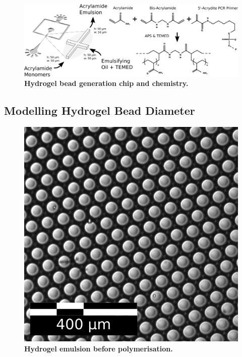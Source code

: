 \begin{figure}[ht]
\centerfloat
\includegraphics[width=\textwidth]{./ims/indrop_beadgen2.png}
\caption[Hydrogel bead generation chip and chemistry]{\textbf{Hydrogel bead generation chip and chemistry.}}
 \label{fig:indrop_beadgen}
\end{figure}

\subsection{Modelling Hydrogel Bead Diameter}
\label{subsect:indrop_model}

\begin{figure}
\vspace{-10pt}
\centering
\includegraphics[width=\textwidth/3]{./ims/indrop_beads_emulsion.png}
\caption[Hydrogel emulsion before polymerisation]{\textbf{Hydrogel emulsion before polymerisation.}}
\label{fig:indrop_beads_emulsion}
\vspace{-30pt}
\end{figure}

